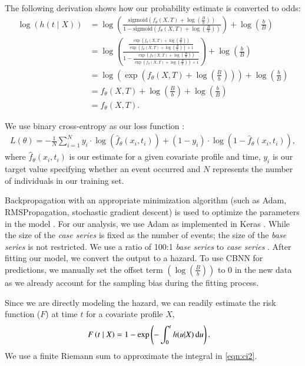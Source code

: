 \documentclass[preprint,12pt,authoryear]{elsarticle}
\begin{document}
The following derivation shows how our probability estimate is converted
to odds: \begin{align*}
 \log\left( h(t \mid X) \right) &= \log\left(\frac{\mathrm{sigmoid}\left(f_{\theta}(X, T) + \log\left(\frac{B}{b}\right)\right)}{1-\mathrm{sigmoid}\left(f_{\theta}(X, T) + \log\left(\frac{B}{b}\right)\right)}\right) + \log\left(\frac{b}{B}\right) \\
 &= \log\left( \frac{\frac{\exp\left(f_{\theta}(X, T) + \log\left(\frac{B}{b}\right)\right)}{\exp\left(f_{\theta}(X, T) + \log\left(\frac{B}{b}\right)\right)+1}}{1-\frac{\exp\left(f_{\theta}(X, T) + \log\left(\frac{B}{b}\right)\right)}{\exp\left(f_{\theta}(X, T) + \log\left(\frac{B}{b}\right)\right)+1}}\right) + \log\left(\frac{b}{B}\right) \\
 &= \log\left(\exp\left( f_{\theta}(X, T) + \log\left(\frac{B}{b}\right) \right) \right) + \log\left(\frac{b}{B}\right) \\
 &= f_{\theta}(X, T) + \log\left(\frac{B}{b}\right) + \log\left(\frac{b}{B}\right) \\
&= f_{\theta}(X, T). 
\end{align*}

We use binary cross-entropy as our loss function \citep{gulli2017}:
\begin{align*}
L(\theta)=-\frac{1}{N} \sum^{N}_{i=1} y_{i} \cdot \log(\hat{f}_{\theta}(x_{i}, t_{i}) ) + (1-y_{i} )\cdot \log(1-\hat{f}_{\theta}(x_{i}, t_{i}) ),
\end{align*} where \(\hat{f}_{\theta}(x_{i}, t_{i})\) is our estimate
for a given covariate profile and time, \(y_{i}\) is our target value specifying whether an event occurred and \(N\) represents
the number of individuals in our training set.

Backpropagation with an appropriate minimization algorithm (such as Adam, RMSPropagation, stochastic gradient
descent) is used to optimize the parameters in the model \citep{gulli2017}. For our analysis, we use Adam as implemented
in Keras \citep{gulli2017}. While the size of the \emph{case series} is fixed as the number of events; the size of the
\emph{base series} is not restricted. We use a ratio of 100:1 \emph{base series} to \emph{case series} \citep{hanley2009}.
After fitting our model, we
convert the output to a hazard. To use CBNN for predictions, we manually set the offset term $\left(\log\left(\frac{B}{b} \right)\right)$
to 0 in the new data as we already account for the sampling bias during the fitting process.

Since we are directly modeling the hazard, we can readily estimate the
risk function (\(F\)) at time \(t\) for a covariate profile \(X\),
\begin{align}\label{eqn:ci2}
F\left(t\mid X\right)& = 1 - \exp\left(-\int_{0}^{t}h(u|X) \,\textrm du\right).
\end{align} We use a finite Riemann sum \citep{hughes2020calculus} to
approximate the integral in \eqref{eqn:ci2}.
\end{document}
